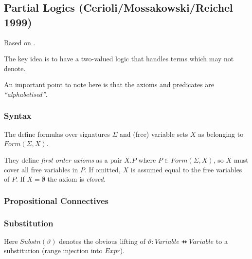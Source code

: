 \subsection{Partial Logics (Cerioli/Mossakowski/Reichel 1999)}
Based on \cite{CMR99}.

The key idea is to have a two-valued logic that handles
terms which may not denote.

An important point to note here is that the axioms and predicates
are \emph{``alphabetised''}.

\subsubsection{Syntax}

The define formulas over signatures $\Sigma$ and (free) variable sets
$X$ as belonging to $Form(\Sigma,X)$.

They define \emph{first order axioms} as a pair $X.P$ where $P \in Form(\Sigma,X)$,
so $X$ must cover all free variables in $P$.
If omitted, $X$ is assumed equal to the free variables of $P$.
If $X=\emptyset$ the axiom is \emph{closed}.

\subsubsection{Propositional Connectives}

\subsubsection{Substitution}

Here $Substn(\vartheta)$ denotes the obvious lifting of $\vartheta:Variable \pfun Variable$
to a substitution (range injection into $Expr$).

